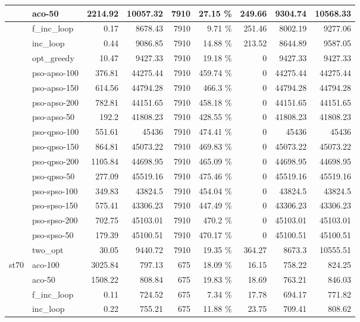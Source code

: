 \documentclass[conference]{IEEEtran}
\begin{document}
\begin{center}
\begin{longtable}[ht]{|l|l|r|r|r|r|r|r|r|}
 & aco-50 & 2214.92 & 10057.32 & 7910 & 27.15 \% & 249.66 & 9304.74 & 10568.33 \\ \hline
 & f\_inc\_loop & 0.17 & 8678.43 & 7910 & 9.71 \% & 251.46 & 8002.19 & 9277.06 \\ \hline
 & inc\_loop & 0.44 & 9086.85 & 7910 & 14.88 \% & 213.52 & 8644.89 & 9587.05 \\ \hline
 & opt\_greedy & 10.47 & 9427.33 & 7910 & 19.18 \% & 0 & 9427.33 & 9427.33 \\ \hline
 & pso-apso-100 & 376.81 & 44275.44 & 7910 & 459.74 \% & 0 & 44275.44 & 44275.44 \\ \hline
 & pso-apso-150 & 614.56 & 44794.28 & 7910 & 466.3 \% & 0 & 44794.28 & 44794.28 \\ \hline
 & pso-apso-200 & 782.81 & 44151.65 & 7910 & 458.18 \% & 0 & 44151.65 & 44151.65 \\ \hline
 & pso-apso-50 & 192.2 & 41808.23 & 7910 & 428.55 \% & 0 & 41808.23 & 41808.23 \\ \hline
 & pso-qpso-100 & 551.61 & 45436 & 7910 & 474.41 \% & 0 & 45436 & 45436 \\ \hline
 & pso-qpso-150 & 864.81 & 45073.22 & 7910 & 469.83 \% & 0 & 45073.22 & 45073.22 \\ \hline
 & pso-qpso-200 & 1105.84 & 44698.95 & 7910 & 465.09 \% & 0 & 44698.95 & 44698.95 \\ \hline
 & pso-qpso-50 & 277.09 & 45519.16 & 7910 & 475.46 \% & 0 & 45519.16 & 45519.16 \\ \hline
 & pso-spso-100 & 349.83 & 43824.5 & 7910 & 454.04 \% & 0 & 43824.5 & 43824.5 \\ \hline
 & pso-spso-150 & 575.41 & 43306.23 & 7910 & 447.49 \% & 0 & 43306.23 & 43306.23 \\ \hline
 & pso-spso-200 & 702.75 & 45103.01 & 7910 & 470.2 \% & 0 & 45103.01 & 45103.01 \\ \hline
 & pso-spso-50 & 179.39 & 45100.51 & 7910 & 470.17 \% & 0 & 45100.51 & 45100.51 \\ \hline
 & two\_opt & 30.05 & 9440.72 & 7910 & 19.35 \% & 364.27 & 8673.3 & 10555.51 \\ \hline
st70 & aco-100 & 3025.84 & 797.13 & 675 & 18.09 \% & 16.15 & 758.22 & 824.25 \\ \hline
 & aco-50 & 1508.22 & 808.84 & 675 & 19.83 \% & 18.69 & 763.21 & 846.03 \\ \hline
 & f\_inc\_loop & 0.11 & 724.52 & 675 & 7.34 \% & 17.78 & 694.17 & 771.82 \\ \hline
 & inc\_loop & 0.22 & 755.21 & 675 & 11.88 \% & 23.75 & 709.41 & 808.62 \\ \hline

\end{longtable}
\end{center}
\end{document}
